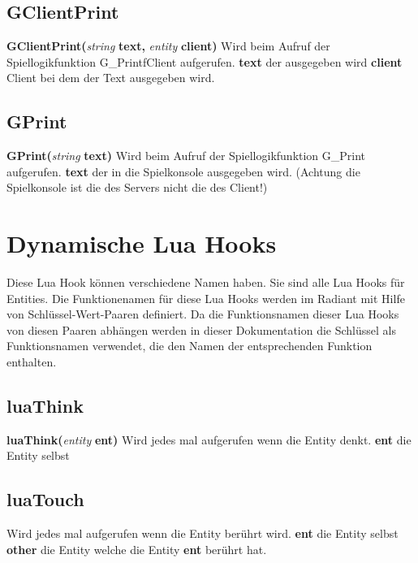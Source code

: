 \documentclass[11pt,a4paper]{book}
\begin{document}
\subsection{GClientPrint}
\label{cli-print}
\textbf{GClientPrint(}\textit{string} \textbf{text, }\textit{entity }\textbf{client)}
\newline
Wird beim Aufruf der Spiellogikfunktion G\_PrintfClient aufgerufen.
\newline
\textbf{text} der ausgegeben wird
\newline
\textbf{client} Client bei dem der Text ausgegeben wird.
\subsection{GPrint}
\label{g-print}
\textbf{GPrint(}\textit{string}\textbf{ text)}
\newline
Wird beim Aufruf der Spiellogikfunktion G\_Print aufgerufen.
\newline
\textbf{text} der in die Spielkonsole ausgegeben wird. (Achtung die Spielkonsole ist die des Servers nicht die des Client!)
\newpage
\section{Dynamische Lua Hooks}
\label{dyn-lh}
Diese Lua Hook können verschiedene Namen haben. Sie sind alle Lua Hooks für Entities. Die Funktionenamen für diese Lua Hooks werden im Radiant mit Hilfe von Schlüssel-Wert-Paaren definiert. 
Da die Funktionsnamen dieser Lua Hooks von diesen Paaren abhängen werden in dieser Dokumentation die Schlüssel als Funktionsnamen verwendet, die den Namen der entsprechenden Funktion enthalten.
\subsection{luaThink}
\label{luaThink}
\textbf{luaThink(}\textit{entity}\textbf{ ent)}
\newline
Wird jedes mal aufgerufen wenn die Entity denkt.
\newline
\textbf{ent} die Entity selbst
\subsection{luaTouch}
\label{luaTouch}
Wird jedes mal aufgerufen wenn die Entity berührt wird.
\newline
\textbf{ent} die Entity selbst
\newline
\textbf{other} die Entity welche die Entity \textbf{ent} berührt hat.
\end{document}
